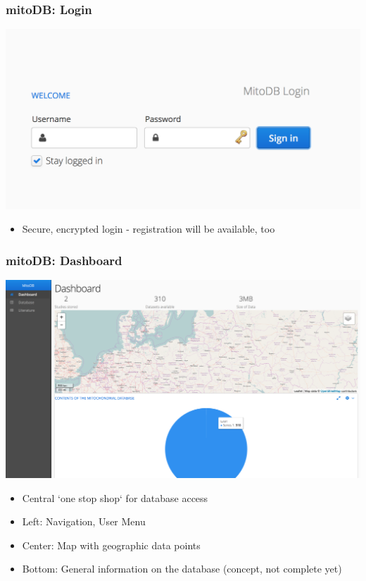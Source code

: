 \documentclass{beamer} %
\begin{document}
\begin{frame}
\frametitle{mitoDB: Login}
\centering
	\includegraphics[scale=0.35]{imagesDB/mitodb_login.png}    
\begin{itemize}
\item Secure, encrypted login - registration will be available, too
\end{itemize}
\end{frame}

\begin{frame}
\frametitle{mitoDB: Dashboard}
\centering
	\includegraphics[scale=0.2]{imagesDB/mitodb_dashboard.png}
\begin{itemize}
\item Central `one stop shop` for database access
\item Left: Navigation, User Menu
\item Center: Map with geographic data points
\item Bottom: General information on the database (concept, not complete yet)
\end{itemize}
\end{frame}
\end{document}
